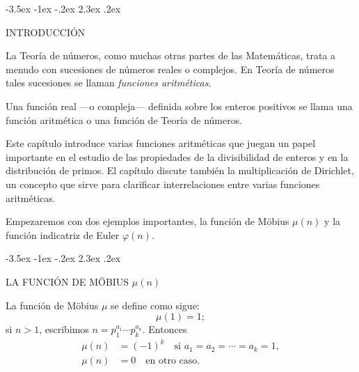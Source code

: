\documentclass[12pt,a4paper]{book}
\makeatletter
\renewcommand\section{\@startsection{section}{1}{\z@}%
  {-3.5ex \@plus -1ex \@minus -.2ex}%
  {2.3ex \@plus .2ex}%
  {\normalfont\Large\bfseries\raggedright}}
\makeatother
\begin{document}
    \section{INTRODUCCIÓN}

    La Teoría de números, como muchas otras partes de las Matemáticas, trata a menudo con
    sucesiones de números reales o complejos. En Teoría de números tales sucesiones se
    llaman \textit{funciones aritméticas}.

    \begin{definicion}
        Una función real —o compleja— definida sobre los enteros positivos se llama una
        función aritmética o una función de Teoría de números.
    \end{definicion}

    Este capítulo introduce varias funciones aritméticas que juegan un papel importante en
    el estudio de las propiedades de la divisibilidad de enteros y en la distribución de
    primos. El capítulo discute también la multiplicación de Dirichlet, un concepto que
    sirve para clarificar interrelaciones entre varias funciones aritméticas.

    Empezaremos con dos ejemplos importantes, la función de Möbius $\mu(n)$ y la función
    indicatriz de Euler $\varphi(n)$.

    \section{LA FUNCIÓN DE MÖBIUS \texorpdfstring{$\mu(n)$}{μ(n)}}\label{sim:mu}

    \begin{definicion}
        La función de Möbius $\mu$ se define como sigue:
        \begin{equation*}
            \mu(1)=1;
        \end{equation*}
        si $n>1$, escribimos $n=p_{1}^{a_{1}}\cdots p_{k}^{a_{k}}$. Entonces
        \begin{align*}
            \mu(n)&=(-1)^{k} \quad\text{si } a_{1}=a_{2}=\cdots=a_{k}=1,\\
            \mu(n)&=0 \quad\text{en otro caso.}
        \end{align*}
    \end{definicion}
\end{document}
